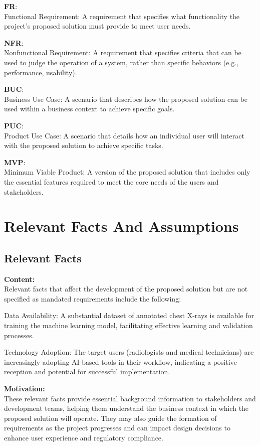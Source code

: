 \documentclass[12pt]{article}
\begin{document}
\textbf{FR}:\\
Functional Requirement: A requirement that specifies what functionality the project’s proposed 
solution must provide to meet user needs.

\textbf{NFR}:\\
Nonfunctional Requirement: A requirement that specifies criteria that can be used to judge the 
operation of a system, rather than specific behaviors (e.g., performance, usability).

\textbf{BUC}:\\
Business Use Case: A scenario that describes how the proposed solution can be used within a 
business context to achieve specific goals.

\textbf{PUC}:\\
Product Use Case: A scenario that details how an individual user will interact with the proposed 
solution to achieve specific tasks.

\textbf{MVP}:\\
Minimum Viable Product: A version of the proposed solution that includes only the essential 
features required to meet the core needs of the users and stakeholders.

\section{Relevant Facts And Assumptions}
\subsection{Relevant Facts}

\textbf{Content:}\\
Relevant facts that affect the development of the proposed solution but are not specified as 
mandated requirements include the following:

Data Availability: A substantial dataset of annotated chest X-rays is available for training the 
machine learning model, facilitating effective learning and validation processes.

Technology Adoption: The target users (radiologists and medical technicians) are increasingly 
adopting AI-based tools in their workflow, indicating a positive reception and potential for 
successful implementation.

\textbf{Motivation:}\\
These relevant facts provide essential background information to stakeholders and development 
teams, helping them understand the business context in which the proposed solution will operate. 
They may also guide the formation of requirements as the project progresses and can impact design 
decisions to enhance user experience and regulatory compliance.
\end{document}
